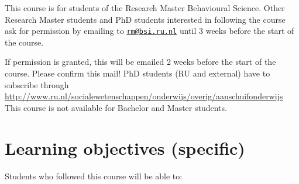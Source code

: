 \documentclass[12pt,]{book}
\let\stdsection\section
\renewcommand\section{\newpage\stdsection}
\theoremstyle{definition}
\theoremstyle{definition}
\theoremstyle{definition}
\theoremstyle{remark}
\begin{document}
This course is for students of the Research Master Behavioural Science.
Other Research Master students and PhD students interested in following
the course ask for permission by emailing to
\href{mailto:rm@bsi.ru.nl}{\nolinkurl{rm@bsi.ru.nl}} until 3 weeks
before the start of the course.

If permission is granted, this will be emailed 2 weeks before the start
of the course. Please confirm this mail! PhD students (RU and external)
have to subscribe through
\url{http://www.ru.nl/socialewetenschappen/onderwijs/overig/aanschuifonderwijs}
This course is not available for Bachelor and Master students.

\section*{Learning objectives
(specific)}\label{learning-objectives-specific}

Students who followed this course will be able to:
\end{document}
